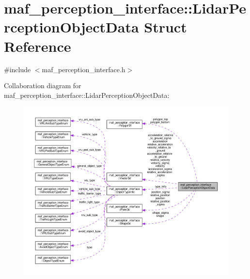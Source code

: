 \hypertarget{structmaf__perception__interface_1_1LidarPerceptionObjectData}{}\section{maf\+\_\+perception\+\_\+interface\+:\+:Lidar\+Perception\+Object\+Data Struct Reference}
\label{structmaf__perception__interface_1_1LidarPerceptionObjectData}


{\ttfamily \#include $<$maf\+\_\+perception\+\_\+interface.\+h$>$}



Collaboration diagram for maf\+\_\+perception\+\_\+interface\+:\+:Lidar\+Perception\+Object\+Data\+:\nopagebreak
\begin{figure}[H]
\begin{center}
\leavevmode
\includegraphics[width=350pt]{structmaf__perception__interface_1_1LidarPerceptionObjectData__coll__graph}
\end{center}
\end{figure}
